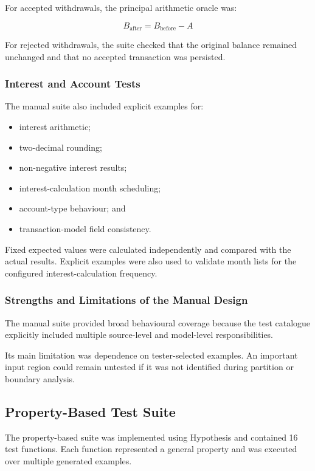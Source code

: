 \documentclass[12pt]{article}
\begin{document}
For accepted withdrawals, the principal arithmetic oracle was:

\[
B_{\text{after}} = B_{\text{before}} - A
\]

For rejected withdrawals, the suite checked that the original balance remained
unchanged and that no accepted transaction was persisted.

\subsubsection{Interest and Account Tests}

The manual suite also included explicit examples for:

\begin{itemize}
    \item interest arithmetic;
    \item two-decimal rounding;
    \item non-negative interest results;
    \item interest-calculation month scheduling;
    \item account-type behaviour; and
    \item transaction-model field consistency.
\end{itemize}

Fixed expected values were calculated independently and compared with the
actual results. Explicit examples were also used to validate month lists for
the configured interest-calculation frequency.

\subsubsection{Strengths and Limitations of the Manual Design}

The manual suite provided broad behavioural coverage because the test catalogue
explicitly included multiple source-level and model-level responsibilities.

Its main limitation was dependence on tester-selected examples. An important
input region could remain untested if it was not identified during partition
or boundary analysis.

\subsection{Property-Based Test Suite}

The property-based suite was implemented using Hypothesis and contained 16
test functions. Each function represented a general property and was executed
over multiple generated examples.
\end{document}
